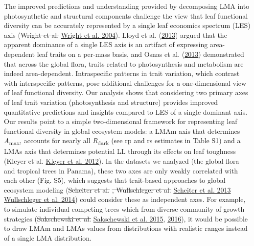 \documentclass[
  12pt,
]{article}
\providecommand{\DIFaddtex}[1]{{\protect\color{blue}\uwave{#1}}} %
\providecommand{\DIFdeltex}[1]{{\protect\color{red}\sout{#1}}}                      %
\providecommand{\DIFaddbegin}{} %
\providecommand{\DIFaddend}{} %
\providecommand{\DIFdelbegin}{} %
\providecommand{\DIFdelend}{} %
\providecommand{\DIFadd}[1]{\texorpdfstring{\DIFaddtex{#1}}{#1}} %
\providecommand{\DIFdel}[1]{\texorpdfstring{\DIFdeltex{#1}}{}} %
\newcommand{\DIFscaledelfig}{0.5}
\newlength{\DIFdelgraphicswidth} %
\newlength{\DIFdelgraphicsheight} %
\newcommand{\DIFaddincludegraphics}[2][]{{\color{blue}\fbox{\DIFOincludegraphics[#1]{#2}}}} %
\newcommand{\DIFdelincludegraphics}[2][]{%
\sbox{\DIFdelgraphicsbox}{\DIFOincludegraphics[#1]{#2}}%
\settoboxwidth{\DIFdelgraphicswidth}{\DIFdelgraphicsbox} %
\settoboxtotalheight{\DIFdelgraphicsheight}{\DIFdelgraphicsbox} %
\scalebox{\DIFscaledelfig}{%
\parbox[b]{\DIFdelgraphicswidth}{\usebox{\DIFdelgraphicsbox}\\[-\baselineskip] \rule{\DIFdelgraphicswidth}{0em}}\llap{\resizebox{\DIFdelgraphicswidth}{\DIFdelgraphicsheight}{%
\setlength{\unitlength}{\DIFdelgraphicswidth}%
\begin{picture}(1,1)%
\thicklines\linethickness{2pt} %
{\color[rgb]{1,0,0}\put(0,0){\framebox(1,1){}}}%
{\color[rgb]{1,0,0}\put(0,0){\line( 1,1){1}}}%
{\color[rgb]{1,0,0}\put(0,1){\line(1,-1){1}}}%
\end{picture}%
}\hspace*{3pt}}} %
} %
\DeclareRobustCommand{\DIFaddbegin}{\DIFOaddbegin \let\includegraphics\DIFaddincludegraphics} %
\DeclareRobustCommand{\DIFaddend}{\DIFOaddend \let\includegraphics\DIFOincludegraphics} %
\DeclareRobustCommand{\DIFdelbegin}{\DIFOdelbegin \let\includegraphics\DIFdelincludegraphics} %
\DeclareRobustCommand{\DIFdelend}{\DIFOaddend \let\includegraphics\DIFOincludegraphics} %
\begin{document}
The improved predictions and understanding provided by decomposing LMA into photosynthetic and structural components challenge the view that leaf functional diversity can be accurately represented by a single leaf economics spectrum (LES) axis (\DIFdelbegin \DIFdel{Wright et al. }\DIFdelend \protect\DIFdelbegin %
\DIFdelend \DIFaddbegin \hyperlink{ref-Wright2004a}{Wright et al. 2004}\DIFaddend ).
Lloyd et al. (\protect\hyperlink{ref-Lloyd2013}{2013}) argued that the apparent dominance of a single LES axis is an artifact of expressing area-dependent leaf traits on a per-mass basis, and Osnas et al. (\protect\hyperlink{ref-Osnas2013}{2013}) demonstrated that across the global flora, traits related to photosynthesis and metabolism are indeed area-dependent.
Intraspecific patterns in trait variation, which contrast with interspecific patterns, pose additional challenges for a one-dimensional view of leaf functional diversity. Our analysis shows that considering two primary axes of leaf trait variation (photosynthesis and structure) provides improved quantitative predictions and insights compared to LES of a single dominant axis.
Our results point to a simple two-dimensional framework for representing leaf functional diversity in global ecosystem models: a LMAm axis that determines \emph{A}\textsubscript{max}, accounts for nearly all \emph{R}\textsubscript{dark} (see rp and rs estimates in Table S1) and a LMAs axis that determines potential LL through its effects on leaf toughness (\DIFdelbegin \DIFdel{Kleyer et al. }\DIFdelend \protect\DIFdelbegin %
\DIFdelend \DIFaddbegin \hyperlink{ref-Kleyer2012}{Kleyer et al. 2012}\DIFaddend ).
In the datasets we analyzed (the global flora and tropical trees in Panama), these two axes are only weakly correlated with each other (Fig. S5), which suggests that trait-based approaches to global ecosystem modeling (\DIFdelbegin \DIFdel{Scheiter et al. }\DIFdelend \protect\DIFdelbegin %
\DIFdel{, Wullschleger et al. }\DIFdelend \DIFaddbegin \hyperlink{ref-Scheiter2013}{Scheiter et al. 2013}\DIFadd{, }\DIFaddend \protect\DIFdelbegin %
\DIFdelend \DIFaddbegin \hyperlink{ref-Wullschleger2014}{Wullschleger et al. 2014}\DIFaddend ) could consider these as independent axes.
For example, to simulate individual competing trees which from diverse community of growth strategies (\DIFdelbegin \DIFdel{Sakschewski et al. }\DIFdelend \protect\DIFdelbegin %
\DIFdelend \DIFaddbegin \hyperlink{ref-Sakschewski2015}{Sakschewski et al. 2015}\DIFaddend , \protect\hyperlink{ref-Sakschewski2016}{2016}), it would be possible to draw LMAm and LMAs values from distributions with realistic ranges instead of a single LMA distribution.
\end{document}
